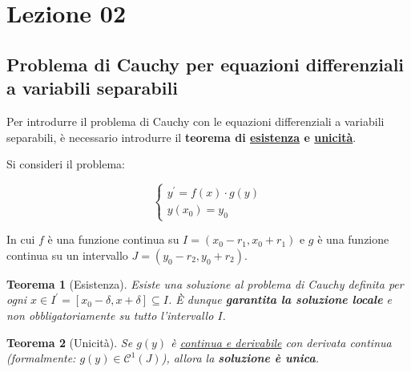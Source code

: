 \documentclass[a4paper]{article}
\newtheorem{theorem}{Teorema}
\begin{document}
	\newpage

	\section{Lezione 02}
	
	\subsection[Problema di Cauchy per eq. diff. a variabili separabili]{Problema di Cauchy per equazioni differenziali a variabili separabili}
	
	Per introdurre il problema di Cauchy con le equazioni differenziali a variabili separabili, è necessario introdurre il \textbf{teorema di \underline{esistenza} e \underline{unicità}}.\newline
	
	\noindent
	Si consideri il problema:
	
	\begin{equation*}
		\begin{cases}
			y^{'} = f\left(x\right) \cdot g\left(y\right) \\
			y\left(x_{0}\right) = y_{0}
		\end{cases}
	\end{equation*}

	\noindent
	In cui $f$ è una funzione continua su $I = \left(x_{0} - r_{1}, x_{0} + r_{1}\right)$ e $g$ è una funzione continua su un intervallo $J = \left(y_{0} - r_{2}, y_{0} + r_{2}\right)$.
	
	\begin{theorem}[Esistenza]\label{teorema esistenza}
		Esiste una soluzione al problema di Cauchy definita per ogni $x \in I^{'} = \left[x_{0} - \delta, x + \delta\right] \subseteq I$. È dunque \textbf{garantita la soluzione locale} e non obbligatoriamente su tutto l'intervallo $I$.
	\end{theorem}

	\begin{theorem}[Unicità]\label{teorema unicità}
		Se $g\left(y\right)$ è \underline{continua e derivabile} con derivata continua (formalmente: $g\left(y\right) \in \mathcal{C}^{1} \left(J\right)$), allora la \textbf{soluzione è unica}.
	\end{theorem}
\end{document}
